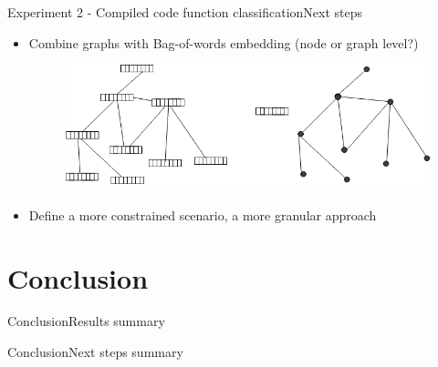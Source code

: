 \documentclass[xcolor=table]{beamer}
\begin{document}
\begin{frame}{Experiment 2 - Compiled code function classification}{Next steps}

\begin{itemize}
    \item Combine graphs with Bag-of-words embedding (node or graph level?)
    \begin{figure}[H]

      \centering
        \includegraphics[width=0.9\linewidth]{img/exp2_improvements.png}

    \end{figure}

    \item Define a more constrained scenario, a more granular approach
\end{itemize}

\end{frame}


\section{Conclusion}
\begin{frame}{Conclusion}{Results summary}

\end{frame}



\begin{frame}{Conclusion}{Next steps summary}

\end{frame}



% 
% 
\end{document}
